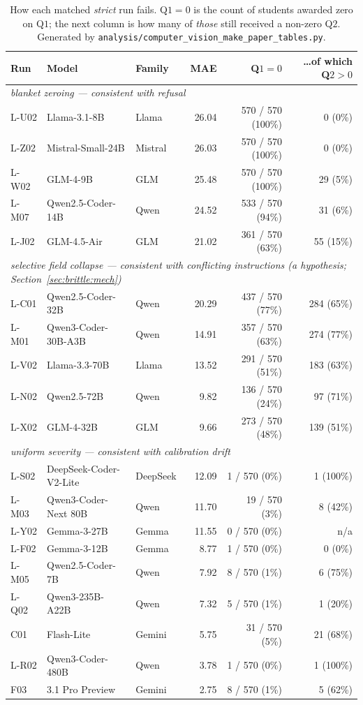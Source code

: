 \begin{table}[h]
\centering
\caption{How each matched \emph{strict} run fails. Q$1 = 0$ is the count of students awarded zero on Q$1$; the next column is how many of \emph{those} still received a non-zero Q$2$. Generated by \texttt{analysis/computer\_vision\_make\_paper\_tables.py}.}
\label{tab:mechanism}
\small
\begin{tabular}{lllrrr}
\toprule
Run & Model & Family & MAE & Q$1 = 0$ & \ldots of which Q$2 > 0$ \\
\midrule
\multicolumn{6}{l}{\emph{blanket zeroing --- consistent with refusal}} \\
L-U02 & Llama-3.1-8B & Llama & 26.04 & 570 / 570 (100\%) & 0 (0\%) \\
L-Z02 & Mistral-Small-24B & Mistral & 26.03 & 570 / 570 (100\%) & 0 (0\%) \\
L-W02 & GLM-4-9B & GLM & 25.48 & 570 / 570 (100\%) & 29 (5\%) \\
L-M07 & Qwen2.5-Coder-14B & Qwen & 24.52 & 533 / 570 (94\%) & 31 (6\%) \\
L-J02 & GLM-4.5-Air & GLM & 21.02 & 361 / 570 (63\%) & 55 (15\%) \\
\midrule
\multicolumn{6}{l}{\emph{selective field collapse --- consistent with conflicting instructions (a hypothesis; Section~\ref{sec:brittle:mech})}} \\
L-C01 & Qwen2.5-Coder-32B & Qwen & 20.29 & 437 / 570 (77\%) & 284 (65\%) \\
L-M01 & Qwen3-Coder-30B-A3B & Qwen & 14.91 & 357 / 570 (63\%) & 274 (77\%) \\
L-V02 & Llama-3.3-70B & Llama & 13.52 & 291 / 570 (51\%) & 183 (63\%) \\
L-N02 & Qwen2.5-72B & Qwen & 9.82 & 136 / 570 (24\%) & 97 (71\%) \\
L-X02 & GLM-4-32B & GLM & 9.66 & 273 / 570 (48\%) & 139 (51\%) \\
\midrule
\multicolumn{6}{l}{\emph{uniform severity --- consistent with calibration drift}} \\
L-S02 & DeepSeek-Coder-V2-Lite & DeepSeek & 12.09 & 1 / 570 (0\%) & 1 (100\%) \\
L-M03 & Qwen3-Coder-Next 80B & Qwen & 11.70 & 19 / 570 (3\%) & 8 (42\%) \\
L-Y02 & Gemma-3-27B & Gemma & 11.55 & 0 / 570 (0\%) & n/a \\
L-F02 & Gemma-3-12B & Gemma & 8.77 & 1 / 570 (0\%) & 0 (0\%) \\
L-M05 & Qwen2.5-Coder-7B & Qwen & 7.92 & 8 / 570 (1\%) & 6 (75\%) \\
L-Q02 & Qwen3-235B-A22B & Qwen & 7.32 & 5 / 570 (1\%) & 1 (20\%) \\
C01 & Flash-Lite & Gemini & 5.75 & 31 / 570 (5\%) & 21 (68\%) \\
L-R02 & Qwen3-Coder-480B & Qwen & 3.78 & 1 / 570 (0\%) & 1 (100\%) \\
F03 & 3.1 Pro Preview & Gemini & 2.75 & 8 / 570 (1\%) & 5 (62\%) \\
\bottomrule
\end{tabular}
\end{table}


